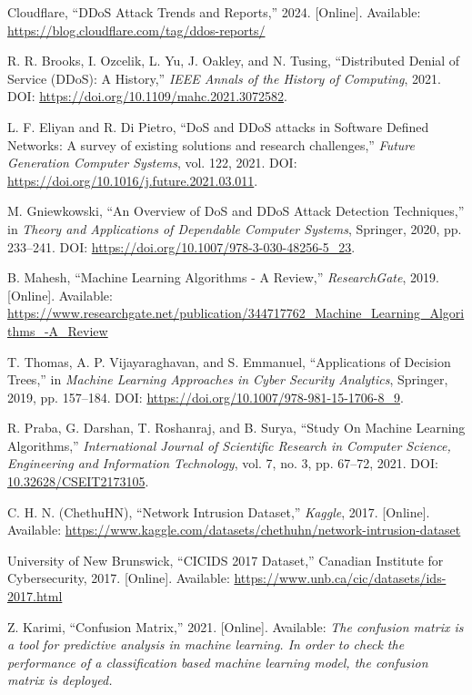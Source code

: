 \documentclass[conference]{IEEEtran}
\begin{document}
\begin{thebibliography}{99}

Cloudflare, ``DDoS Attack Trends and Reports,'' 2024. [Online]. Available: \url{https://blog.cloudflare.com/tag/ddos-reports/}


R. R. Brooks, I. Ozcelik, L. Yu, J. Oakley, and N. Tusing, ``Distributed Denial of Service (DDoS): A History,'' \textit{IEEE Annals of the History of Computing}, 2021. DOI: \url{https://doi.org/10.1109/mahc.2021.3072582}.

L. F. Eliyan and R. Di Pietro, ``DoS and DDoS attacks in Software Defined Networks: A survey of existing solutions and research challenges,'' \textit{Future Generation Computer Systems}, vol. 122, 2021. DOI: \url{https://doi.org/10.1016/j.future.2021.03.011}.

M. Gniewkowski, ``An Overview of DoS and DDoS Attack Detection Techniques,'' in \textit{Theory and Applications of Dependable Computer Systems}, Springer, 2020, pp. 233–241. DOI: \url{https://doi.org/10.1007/978-3-030-48256-5_23}.

B. Mahesh, ``Machine Learning Algorithms - A Review,'' \textit{ResearchGate}, 2019. [Online]. Available: \url{https://www.researchgate.net/publication/344717762_Machine_Learning_Algorithms_-A_Review}

T. Thomas, A. P. Vijayaraghavan, and S. Emmanuel, ``Applications of Decision Trees,'' in \textit{Machine Learning Approaches in Cyber Security Analytics}, Springer, 2019, pp. 157–184. DOI: \url{https://doi.org/10.1007/978-981-15-1706-8_9}.

R. Praba, G. Darshan, T. Roshanraj, and B. Surya, ``Study On Machine Learning Algorithms,'' \textit{International Journal of Scientific Research in Computer Science, Engineering and Information Technology}, vol. 7, no. 3, pp. 67–72, 2021. DOI: \url{10.32628/CSEIT2173105}.

C. H. N. (ChethuHN), ``Network Intrusion Dataset,'' \textit{Kaggle}, 2017. [Online]. Available: \url{https://www.kaggle.com/datasets/chethuhn/network-intrusion-dataset}

University of New Brunswick, ``CICIDS 2017 Dataset,'' Canadian Institute for Cybersecurity, 2017. [Online]. Available: \url{https://www.unb.ca/cic/datasets/ids-2017.html}

Z. Karimi, ``Confusion Matrix,'' 2021. [Online]. Available: \textit{The confusion matrix is a tool for predictive analysis in machine learning. In order to check the performance of a classification based machine learning model, the confusion matrix is deployed.}


\end{thebibliography}
\end{document}
